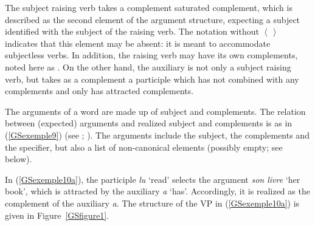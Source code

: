 {\begin{exe}
\begin{xlist}
	\end{xlist}
\end{exe}

The subject raising verb takes a complement saturated complement, which is described as the second
element of the argument structure, expecting a subject  identified with the subject of the
raising verb. The notation  without $\left< \, \right>$ indicates that this element may be
absent: it is meant to accommodate subjectless verbs. In addition, the raising verb may have its own
complements, noted here as . On the other hand, the auxiliary is not only a subject raising
verb, but takes as a complement a participle which has not combined with any complements and  only has attracted complements.

The arguments of a word are made up of subject and complements. The relation between (expected) arguments and realized subject and complements is as in (\ref{GSexemple9}) (see \citealt[171]{GSag2000a-u}; \citealt{BMS2001a}). The arguments include the subject, the complements and the specifier, but also a list of non-canonical elements (possibly empty; see below).

\begin{exe}
\end{exe}

In (\ref{GSexemple10a}), the participle \emph{lu} `read' selects the argument \emph{son livre} `her book', which is attracted by the auxiliary \emph{a} `has'. Accordingly, it is realized as the complement of the auxiliary \emph{a}. The structure of the VP in (\ref{GSexemple10a}) is given in Figure~\ref{GSfigure1}.

}
